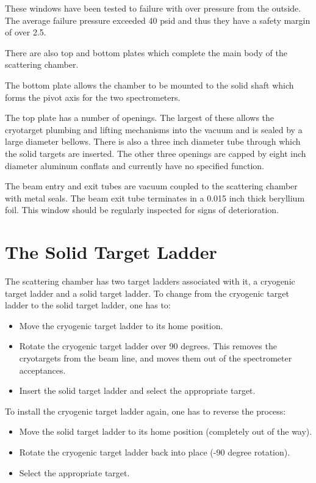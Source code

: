 These windows have been tested to failure with over pressure from the
outside.  The average failure pressure exceeded 40 psid and thus they
have a safety margin of over 2.5.  

There are also top and bottom plates which complete the main body of the
scattering chamber.

The bottom plate allows the chamber to be mounted to the
solid shaft which forms the pivot axis for the two spectrometers.


The top plate has a number of openings. The largest of these allows
the cryotarget plumbing and lifting mechanisms into the vacuum and is sealed by
a large diameter bellows. There is also a three inch diameter tube through
which the solid targets are inserted.
The other three openings are capped by eight inch diameter aluminum
conflats and currently have no specified function.

The beam entry and exit tubes are vacuum coupled to the scattering chamber with
metal seals. The beam exit tube terminates in a 0.015 inch thick beryllium foil.
This window should be regularly inspected for signs of deterioration.


\section{The Solid Target Ladder}

The scattering chamber has two target ladders associated with it,
a cryogenic target ladder and a solid target ladder. To change
from the cryogenic target ladder to the solid target ladder, one has
to:

\begin{itemize}
\item{Move the cryogenic target ladder to its home position.}
\item{Rotate the cryogenic target ladder over 90 degrees. This removes
the cryotargets from the beam line, and moves them out of the spectrometer
acceptances.}
\item{Insert the solid target ladder and select the appropriate target.}
\end{itemize}

\noindent To install the cryogenic target ladder again, one has to reverse the
process:

\begin{itemize}
\item{Move the solid target ladder to its home position (completely out
of the way).}
\item{Rotate the cryogenic target ladder back into place (-90 degree
rotation).}
\item{Select the appropriate target.}
\end{itemize}

